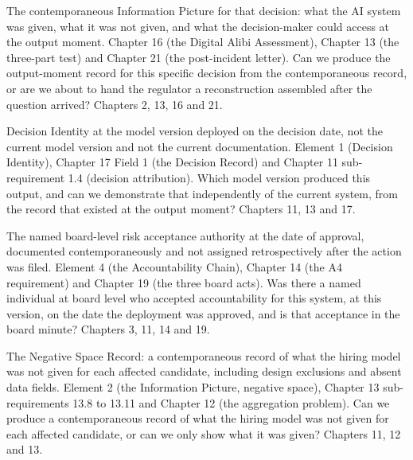 {The contemporaneous Information Picture for that decision: what the AI system was given, what it was not given, and what the decision-maker could access at the output moment.}
{Chapter 16 (the Digital Alibi Assessment), Chapter 13 (the three-part test) and Chapter 21 (the post-incident letter).}
{Can we produce the output-moment record for this specific decision from the contemporaneous record, or are we about to hand the regulator a reconstruction assembled after the question arrived?}
{Chapters 2, 13, 16 and 21.}

{Decision Identity at the model version deployed on the decision date, not the current model version and not the current documentation.}
{Element 1 (Decision Identity), Chapter 17 Field 1 (the Decision Record) and Chapter 11 sub-requirement 1.4 (decision attribution).}
{Which model version produced this output, and can we demonstrate that independently of the current system, from the record that existed at the output moment?}
{Chapters 11, 13 and 17.}

{The named board-level risk acceptance authority at the date of approval, documented contemporaneously and not assigned retrospectively after the action was filed.}
{Element 4 (the Accountability Chain), Chapter 14 (the A4 requirement) and Chapter 19 (the three board acts).}
{Was there a named individual at board level who accepted accountability for this system, at this version, on the date the deployment was approved, and is that acceptance in the board minute?}
{Chapters 3, 11, 14 and 19.}

{The Negative Space Record: a contemporaneous record of what the hiring model was not given for each affected candidate, including design exclusions and absent data fields.}
{Element 2 (the Information Picture, negative space), Chapter 13 sub-requirements 13.8 to 13.11 and Chapter 12 (the aggregation problem).}
{Can we produce a contemporaneous record of what the hiring model was not given for each affected candidate, or can we only show what it was given?}
{Chapters 11, 12 and 13.}

